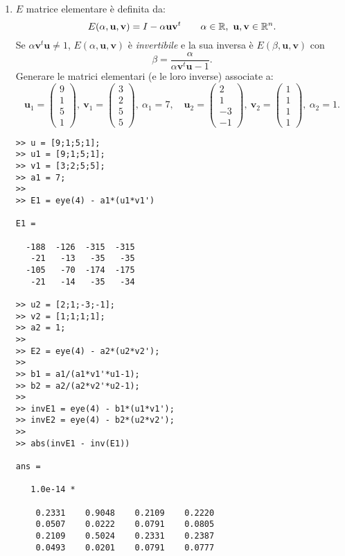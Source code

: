 \begin{enumerate}
\item $E$ matrice elementare è definita da:
\[
E(\alpha, \mathbf{u}, \mathbf{v}) = I - \alpha\mathbf{u}\mathbf{v}^t
\qquad \alpha \in \mathbb{R},\ \mathbf{u}, \mathbf{v} \in \mathbb{R}^n.
\]
Se $\alpha \mathbf{v}^t \mathbf{u} \neq 1$, $E(\alpha, \mathbf{u}, \mathbf{v})$
è \emph{invertibile} e la sua inversa è $E(\beta, \mathbf{u}, \mathbf{v})$ con
\[ \beta = \frac{\alpha}{\alpha \mathbf{v}^t \mathbf{u}-1}.\]
Generare le matrici elementari (e le loro inverse) associate a:
\[
\mathbf{u}_1 = \left(\begin{array}{c}9\\1\\5\\1\end{array}\right), \
\mathbf{v}_1 = \left(\begin{array}{c}3\\2\\5\\5\end{array}\right), \
\alpha_1 = 7, \quad
\mathbf{u}_2 = \left(\begin{array}{c}2\\1\\-3\\-1\end{array}\right), \
\mathbf{v}_2 = \left(\begin{array}{c}1\\1\\1\\1\end{array}\right), \
\alpha_2 = 1.
\]

\begin{svol}
\begin{codice}
\begin{verbatim}
>> u = [9;1;5;1];
>> u1 = [9;1;5;1];
>> v1 = [3;2;5;5];
>> a1 = 7;
>> 
>> E1 = eye(4) - a1*(u1*v1')

E1 =

  -188  -126  -315  -315
   -21   -13   -35   -35
  -105   -70  -174  -175
   -21   -14   -35   -34

>> u2 = [2;1;-3;-1];
>> v2 = [1;1;1;1];
>> a2 = 1;
>> 
>> E2 = eye(4) - a2*(u2*v2');
>> 
>> b1 = a1/(a1*v1'*u1-1);
>> b2 = a2/(a2*v2'*u2-1);
>> 
>> invE1 = eye(4) - b1*(u1*v1');
>> invE2 = eye(4) - b2*(u2*v2');
>> 
>> abs(invE1 - inv(E1))

ans =

   1.0e-14 *

    0.2331    0.9048    0.2109    0.2220
    0.0507    0.0222    0.0791    0.0805
    0.2109    0.5024    0.2331    0.2387
    0.0493    0.0201    0.0791    0.0777


\end{verbatim}
\end{codice}
\end{svol}
\end{enumerate}
